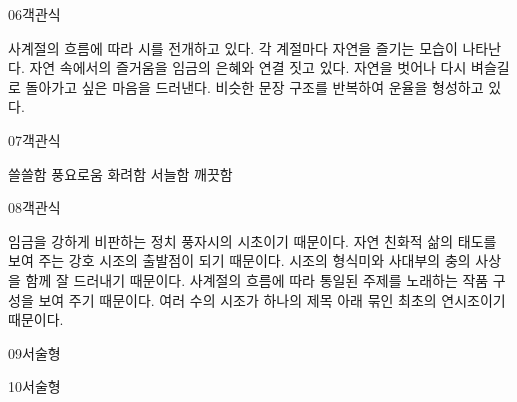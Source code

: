 \documentclass[fs85,seriesRus]{korfarm-base}
\begin{document}
\begin{kfQBlock}{06}{객관식}
\begin{kfChoices}
\kfChoice 사계절의 흐름에 따라 시를 전개하고 있다.
\kfChoice 각 계절마다 자연을 즐기는 모습이 나타난다.
\kfChoice 자연 속에서의 즐거움을 임금의 은혜와 연결 짓고 있다.
\kfChoice 자연을 벗어나 다시 벼슬길로 돌아가고 싶은 마음을 드러낸다.
\kfChoice 비슷한 문장 구조를 반복하여 운율을 형성하고 있다.
\end{kfChoices}
\end{kfQBlock}
\begin{kfQBlock}{07}{객관식}
\begin{kfChoices}
\kfChoice 쓸쓸함
\kfChoice 풍요로움
\kfChoice 화려함
\kfChoice 서늘함
\kfChoice 깨끗함
\end{kfChoices}
\end{kfQBlock}
\begin{kfQBlock}{08}{객관식}
\begin{kfChoices}
\kfChoice 임금을 강하게 비판하는 정치 풍자시의 시초이기 때문이다.
\kfChoice 자연 친화적 삶의 태도를 보여 주는 강호 시조의 출발점이 되기 때문이다.
\kfChoice 시조의 형식미와 사대부의 충의 사상을 함께 잘 드러내기 때문이다.
\kfChoice 사계절의 흐름에 따라 통일된 주제를 노래하는 작품 구성을 보여 주기 때문이다.
\kfChoice 여러 수의 시조가 하나의 제목 아래 묶인 최초의 연시조이기 때문이다.
\end{kfChoices}
\end{kfQBlock}
\begin{kfQBlock}{09}{서술형}
\end{kfQBlock}
\begin{kfQBlock}{10}{서술형}
\end{kfQBlock}
\kfEndMC


\end{document}

